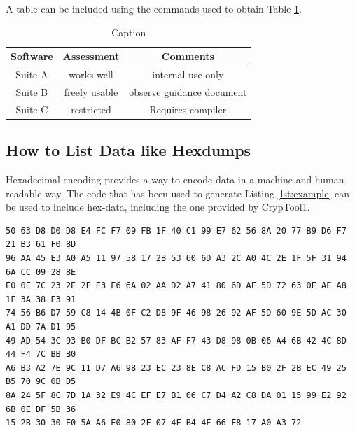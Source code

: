 \documentclass[]{scrartcl}
\newcommand{\ctone}{CrypTool1}
\begin{document}
A table can be included using the commands used to obtain Table \ref{tab:example}.

\begin{table}[ht]
    \centering
    \begin{tabular}{|c|c|c|}
    \hline
        Software & Assessment & Comments \\
        \hline
        Suite A & works well & internal use only \\
        \hline
        Suite B & freely usable & observe guidance document \\
        \hline
        Suite C & restricted & Requires compiler \\
        \hline 
    \end{tabular}
    \caption{Caption}
    \label{tab:example}
\end{table}

\subsection{How to List Data like Hexdumps}

Hexadecimal encoding provides a way to encode data in a machine and human-readable way. The code that has been used to generate Listing \ref{lst:example} can be used to include hex-data, including the one provided by \ctone{}. 
\begin{lstlisting}[style=plusStyle, caption={Example for how to include hex-data.},basicstyle=\tiny\ttfamily,label=lst:example]
50 63 D8 D0 D8 E4 FC F7 09 FB 1F 40 C1 99 E7 62 56 8A 20 77 B9 D6 F7 21 B3 61 F0 8D
96 AA 45 E3 A0 A5 11 97 58 17 2B 53 60 6D A3 2C A0 4C 2E 1F 5F 31 94 6A CC 09 28 8E
E0 0E 7C 23 2E 2F E3 E6 6A 02 AA D2 A7 41 80 6D AF 5D 72 63 0E AE A8 1F 3A 38 E3 91
74 56 B6 D7 59 C8 14 4B 0F C2 D8 9F 46 98 26 92 AF 5D 60 9E 5D AC 30 A1 DD 7A D1 95
49 AD 54 3C 93 B0 DF BC B2 57 83 AF F7 43 D8 98 0B 06 A4 6B 42 4C 8D 44 F4 7C BB B0
A6 B3 A2 7E 9C 11 D7 A6 98 23 EC 23 8E C8 AC FD 15 B0 2F 2B EC 49 25 B5 70 9C 0B D5
8A 24 5F 8C 7D 1A 32 E9 4C EF E7 B1 06 C7 D4 A2 C8 DA 01 15 99 E2 92 6B 0E DF 5B 36
15 2B 30 30 E0 5A A6 E0 80 2F 07 4F B4 4F 66 F8 17 A0 A3 72
\end{lstlisting}
\end{document}
